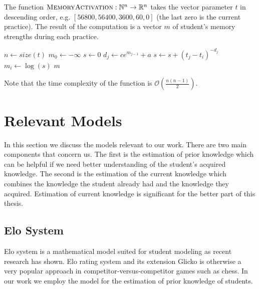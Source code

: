 \begin{algorithm}
  \caption{The function $\textsc{MemoryActivation}: \mathbb{N}^n \rightarrow \mathbb{R}^n$ takes the vector parameter $t$ in descending order, e.g. $[56800, 56400, 3600, 60, 0]$ (the last zero is the current practice). The result of the computation is a vector $m$ of student's memory strengths during each practice.}
  \label{alg-memory-activation}
  \begin{algorithmic}[1]
      \State $n \gets size(t)$
      \State $m_0 \gets -\infty$
        \State $s \gets 0$
          \State $d_j \gets ce^{m_{j-1}} + a$
          \State $s \gets s + (t_j - t_i)^{-d_j}$
        \EndFor
        \State $m_i \gets \log(s)$
      \EndFor
      \State \Return $m$
    \EndFunction
  \end{algorithmic}
\end{algorithm}


Note that the time complexity of the function is $\mathcal{O}\left(\frac{n(n-1)}{2}\right)$.

\section{Relevant Models}
\label{relevant-models}

In this section we discuss the models relevant to our work. There are two main components that concern us. The first is the estimation of prior knowledge which can be helpful if we need better understanding of the student's acquired knowledge. The second is the estimation of the current knowledge which combines the knowledge the student already had and the knowledge they acquired. Estimation of current knowledge is significant for the better part of this thesis.

\subsection{Elo System}
\label{elo}

Elo system is a mathematical model suited for student modeling as recent research has shown. Elo rating system and its extension Glicko is otherwise a very popular approach in competitor-versus-competitor games such as chess. In our work we employ the model for the estimation of prior knowledge of students.

